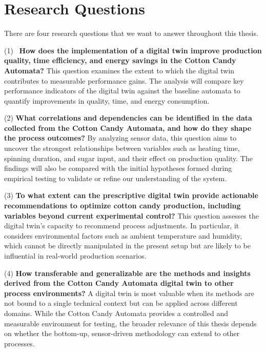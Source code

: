 \section{Research Questions}
\label{sec:intro:rq}

There are four research questions that we want to answer throughout this thesis.

(1) \
\textbf{How does the implementation of a digital twin improve production quality, time efficiency, and energy savings in the Cotton Candy Automata?}
This question examines the extent to which the digital twin contributes to measurable performance gains. The analysis will compare key performance indicators of the digital twin against the baseline automata to quantify improvements in quality, time, and energy consumption.

(2) \textbf{What correlations and dependencies can be identified in the data collected from the Cotton Candy Automata, and how do they shape the process outcomes?}
By analyzing sensor data, this question aims to uncover the strongest relationships between variables such as heating time, spinning duration, and sugar input, and their effect on production quality. The findings will also be compared with the initial hypotheses formed during empirical testing to validate or refine our understanding of the system.

(3) \textbf{To what extent can the prescriptive digital twin provide actionable recommendations to optimize cotton candy production, including variables beyond current experimental control?}
This question assesses the digital twin’s capacity to recommend process adjustments. In particular, it considers environmental factors such as ambient temperature and humidity, which cannot be directly manipulated in the present setup but are likely to be influential in real-world production scenarios.


(4) \textbf{How transferable and generalizable are the methods and insights derived from the Cotton Candy Automata digital twin to other process environments?}
A digital twin is most valuable when its methods are not bound to a single technical context but can be applied across different domains. While the Cotton Candy Automata provides a controlled and measurable environment for testing, the broader relevance of this thesis depends on whether the bottom-up, sensor-driven methodology can extend to other processes.

